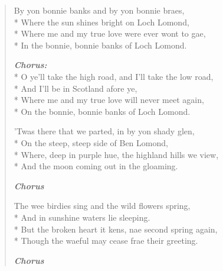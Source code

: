\documentclass[9pt,twoside]{extarticle}
\newenvironment{xverse}{
	\begin{verse}
	\fontsize{8.5}{10.5}\selectfont
	}
	{
	\end{verse}
	\penalty 0
}
\newcommand{\chorusdef}{\textbf{\emph{Chorus:}}\\*}
\newcommand{\chorusmark}[1][1]{%
\vspace{-0.5\stanzaskip}%
\textbf{\emph{Chorus \ifthenelse{\equal{#1}{1}}{}{$\times$ #1}}}%
\vspace{-0.5\stanzaskip}%
}
\begin{document}
\begin{xverse}
By yon bonnie banks and by yon bonnie braes, \\*
Where the sun shines bright on Loch Lomond, \\*
Where me and my true love were ever wont to gae, \\*
In the bonnie, bonnie banks of Loch Lomond.

\chorusdef
O ye’ll take the high road, and I’ll take the low road, \\*
And I’ll be in Scotland afore ye, \\*
Where me and my true love will never meet again, \\*
On the bonnie, bonnie banks of Loch Lomond.

’Twas there that we parted, in by yon shady glen, \\*
On the steep, steep side of Ben Lomond, \\*
Where, deep in purple hue, the highland hills we view, \\*
And the moon coming out in the gloaming.

\chorusmark

The wee birdies sing and the wild flowers spring, \\*
And in sunshine waters lie sleeping. \\*
But the broken heart it kens, nae second spring again, \\*
Though the waeful may cease frae their greeting.

\chorusmark
\end{xverse}
\end{document}
